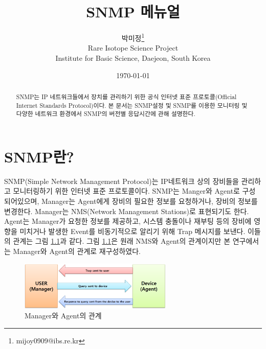 \documentclass[11pt
  , a4paper
  , article
  , oneside
]{memoir}
\begin{document}
\newcommand{\technumber}{
  RAON Control-Document Series\\
  Revision : v1.0,   Release : a fixed date}
\title{\textbf{SNMP 메뉴얼}}

\author{박미정\thanks{mijoy0909@ibs.re.kr} \\

  Rare Isotope Science Project\\
  Institute for Basic Science, Daejeon, South Korea
}
\date{\today}

\renewcommand{\maketitlehooka}{\begin{flushright}\textsf{\technumber}\end{flushright}}

\maketitle

\begin{abstract}
SNMP는 IP 네트워크들에서 장치를 관리하기 위한 공식 인터넷 표준 프로토콜(Official Internet Standards Protocol)\citep{oisp}이다. 본 문서는 SNMP설정 및 SNMP를 이용한 모니터링 및 다양한 네트워크 환경에서 SNMP의 버전별 응답시간에 관해 설명한다. 
\end{abstract}

\chapter{SNMP란?}
SNMP(Simple Network Management Protocol)는 IP네트워크 상의 장비들을 관리하고 모니터링하기 위한 인터넷 표준 프로토콜이다. SNMP는 Manger와 Agent로 구성되어있으며, Manager는 Agent에게 장비의 필요한 정보를 요청하거나, 장비의 정보를 변경한다. Manager는 NMS(Network Management Stations)로 표현되기도 한다. Agent는 Manager가 요청한 정보를 제공하고, 시스템 충돌이나 재부팅 등의 장비에 영향을 미치거나 발생한 Event를 비동기적으로 알리기 위해 Trap 메시지를 보낸다. 이들의 관계는 그림 \ref{fig:relationship_m_a}과 같다. 그림 \ref{fig:relationship_m_a}은 원래 NMS와 Agent의 관계이지만 본 연구에서는 Manager와 Agent의 관계로 재구성하였다.
\begin{figure}[h!]
  \centering
  \includegraphics[width=0.65\textwidth]{./images/relationship_m_a.eps}
  \caption{Manager와 Agent의 관계}
  \label{fig:relationship_m_a}   
\end{figure}
\end{document}
